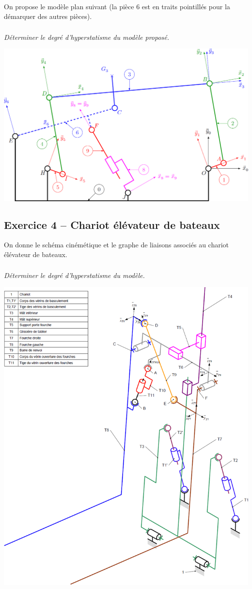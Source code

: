 \documentclass[10pt,fleqn]{article} %
\begin{document}
\begin{multicols}{2}
On propose le modèle plan suivant (la pièce 6 est en traits pointillés pour la démarquer des autres pièces).

\subparagraph{}\textit{Déterminer le degré d'hyperstatisme du modèle proposé.}

\begin{center}
\includegraphics[width=\linewidth]{images/aero_06.png}
\end{center}

\subsection*{Exercice 4 -- Chariot élévateur de bateaux}
On donne le schéma cinémétique et le graphe de liaisons associés au chariot élévateur de bateaux. 
\setcounter{exo}{0}
\subparagraph{}\textit{Déterminer le degré d'hyperstatisme du modèle.}
\begin{center}
\includegraphics[width=.8\linewidth]{images/fig_11.png}
\end{center}


\end{multicols}
\end{document}
